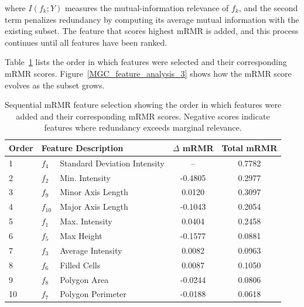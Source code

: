 \documentclass{erauthesis}
\begin{document}
where $I(f_k; Y)$ measures the mutual-information relevance of $f_k$, and the second term penalizes redundancy by computing its average mutual information with the existing subset.
The feature that scores highest mRMR is added, and this process continues until all features have been ranked.

Table~\ref{tbl:mrmr_selection} lists the order in which features were selected and their corresponding mRMR scores. Figure~\ref{MGC_feature_analysis_3} shows how the mRMR score evolves as the subset grows.

\begin{table}[htbp]
\centering
    \begin{tabular}{l l l c c}
        \hline
        Order & \multicolumn{2}{l}{Feature Description} & $\Delta$ mRMR & Total mRMR \\
\hline \hline
        1  & $f_4$  & Standard Deviation Intensity    & --        & 0.7782 \\
        \hline
        2  & $f_2$  & Min. Intensity          & -0.4805   & 0.2977 \\
        3  & $f_9$  & Minor Axis Length        & 0.0120    & 0.3097 \\
        4  & $f_{10}$ & Major Axis Length      & -0.1043   & 0.2054 \\
        5  & $f_1$  & Max. Intensity          & 0.0404    & 0.2458 \\
        6  & $f_5$  & Max Height               & -0.1577   & 0.0881 \\
        7  & $f_3$  & Average Intensity          & 0.0082    & 0.0963 \\
        8  & $f_6$  & Filled Cells             & 0.0087    & 0.1050 \\
        9  & $f_8$  & Polygon Area             & -0.0244   & 0.0806 \\
        10 & $f_7$  & Polygon Perimeter        & -0.0188   & 0.0618 \\
        \hline
    \end{tabular}
\caption{Sequential mRMR feature selection showing the order in which features were added and their corresponding mRMR scores. Negative scores indicate features where redundancy exceeds marginal relevance.}
\label{tbl:mrmr_selection}
\end{table}
\end{document}

